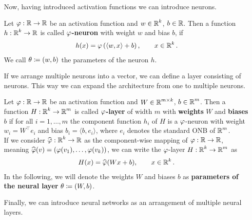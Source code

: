 Now, having introduced activation functions we can introduce neurons.


\begin{definition}
Let $\operatorname{\varphi}: \operatorname{\mathbb{R}} \to \operatorname{\mathbb{R}}$ be an activation function and $w\in \operatorname{\mathbb{R}}^k$, $b \in \operatorname{\mathbb{R}}$. Then a function $h: \operatorname{\mathbb{R}}^k \to \operatorname{\mathbb{R}}$ is called \textbf{$\operatorname{\varphi}$-neuron} with weight $w$ and bias $b$, if
\begin{align}\label{def_neuron}
h(x) = \operatorname{\varphi} \left(\langle w, x \rangle + b \right), \qquad x \in \operatorname{\mathbb{R}}^k.
\end{align}
We call $\theta \coloneqq (w, b)$ the parameters of the neuron $h$.
\end{definition}


If we arrange multiple neurons into a vector, we can define a layer consisting of neurons. This way we can expand the architecture from one to multiple neurons.


\begin{definition}\label{def:layer}
Let $\operatorname{\varphi}: \operatorname{\mathbb{R}} \to \operatorname{\mathbb{R}}$ be an activation function and $W \in \operatorname{\mathbb{R}}^{m\times k}$, $b\in \operatorname{\mathbb{R}}^m$. Then a function $H:\operatorname{\mathbb{R}}^k \to \operatorname{\mathbb{R}}^m$ is called \textbf{$\operatorname{\varphi}$-layer} of width $m$ with \textbf{weights} $W$ and \textbf{biases} $b$ if for all $i=1,\ldots,m$ the component function $h_i$ of $H$ is a $\operatorname{\varphi}$-neuron with weight $w_i = W^\top e_i$ and bias $b_i = \langle b, e_i \rangle$, where $e_i$ denotes the standard ONB of $\operatorname{\mathbb{R}}^m$.\\
If we consider $\widehat{\operatorname{\varphi}}: \operatorname{\mathbb{R}}^k \to \operatorname{\mathbb{R}}$ as the component-wise mapping of $\operatorname{\varphi}:\operatorname{\mathbb{R}}\to \operatorname{\mathbb{R}}$, meaning $\widehat{\operatorname{\varphi}}(v) = (\operatorname{\varphi}(v_1), \ldots, \operatorname{\varphi}(v_k))$, we can write the $\operatorname{\varphi}$-layer $H:\operatorname{\mathbb{R}}^k \to \operatorname{\mathbb{R}}^m$ as
\begin{align}\label{eq_linear_layer}
H(x) = \widehat{\operatorname{\varphi}}(Wx + b), \qquad x \in \operatorname{\mathbb{R}}^k.
\end{align}
In the following, we will denote the weights $W$ and biases $b$ as \textbf{parameters of the neural layer} $\theta \coloneqq (W, b)$.
\end{definition}


Finally, we can introduce neural networks as an arrangement of multiple neural layers.


